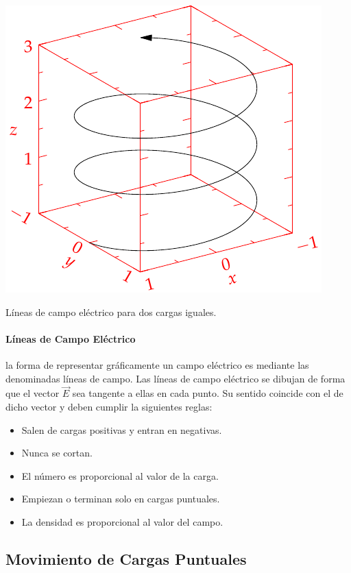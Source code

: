 \documentclass{tufte-handout}
\begin{document}
\begin{marginfigure}%
    \includegraphics[width=\linewidth]{helix}
    \caption{Líneas de campo eléctrico para dos cargas iguales.}
    \label{fig:lineascampoelectrico}
\end{marginfigure}

\paragraph{Líneas de Campo Eléctrico} la forma de representar gráficamente un campo eléctrico es mediante las denominadas líneas de campo. Las líneas de campo eléctrico se dibujan de forma que el vector $\vec{E}$ sea tangente a ellas en cada punto. Su sentido coincide con el de dicho vector y deben cumplir la siguientes reglas:

\begin{itemize}
    \item Salen de cargas positivas y entran en negativas.
    \item Nunca se cortan.
    \item El número es proporcional al valor de la carga.
    \item Empiezan o terminan solo en cargas puntuales.
    \item La densidad es proporcional al valor del campo.
\end{itemize}

\subsection{Movimiento de Cargas Puntuales}
\end{document}
